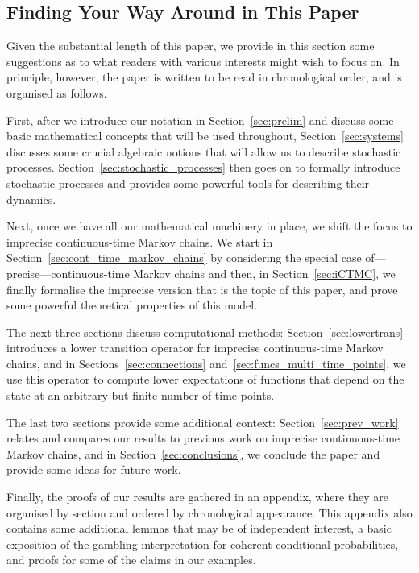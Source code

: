 \documentclass[10pt,a4paper]{paper}
\theoremstyle{definition}
\begin{document}
\subsection{Finding Your Way Around in This Paper}

Given the substantial length of this paper, we provide in this section some suggestions as to what readers with various interests might wish to focus on. In principle, however, the paper is written to be read in chronological order, and is organised as follows.

First, after we  introduce our notation in Section~\ref{sec:prelim} and discuss some basic mathematical concepts that will be used throughout, Section~\ref{sec:systems} discusses some crucial algebraic notions that will allow us to describe stochastic processes. Section~\ref{sec:stochastic_processes} then goes on to formally introduce stochastic processes and provides some powerful tools for describing their dynamics. 

Next, once we have all our mathematical machinery in place, we shift the focus to imprecise continuous-time Markov chains. We start in Section~\ref{sec:cont_time_markov_chains} by considering the special case of---precise---continuous-time Markov chains and then, in Section~\ref{sec:iCTMC}, we finally formalise the imprecise version that is the topic of this paper, and prove some powerful theoretical properties of this model.


The next three sections discuss computational methods: Section~\ref{sec:lowertrans} introduces a lower transition operator for imprecise continuous-time Markov chains, and in Sections~\ref{sec:connections} and~\ref{sec:funcs_multi_time_points}, we use this operator to compute lower expectations of functions that depend on the state at an arbitrary but finite number of time points. 

The last two sections provide some additional context: Section~\ref{sec:prev_work} relates and compares our results to previous work on imprecise continuous-time Markov chains, and in
Section~\ref{sec:conclusions}, we conclude the paper and provide some ideas for future work. 


Finally, the proofs of our results are gathered in an appendix, where they are organised by section and ordered by chronological appearance. This appendix also contains some additional lemmas that may be of independent interest, a basic exposition of the gambling interpretation for coherent conditional probabilities, and proofs for some of the claims in our examples.
\end{document}
